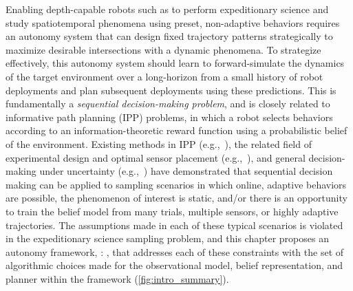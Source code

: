 Enabling depth-capable robots such as \Sentry to perform expeditionary science and study spatiotemporal phenomena using preset, non-adaptive behaviors requires an autonomy system that can design fixed trajectory patterns strategically to maximize desirable intersections with a dynamic phenomena. To strategize effectively, this autonomy system should learn to forward-simulate the dynamics of the target environment over a long-horizon from a small history of robot deployments and plan subsequent deployments using these predictions. This is fundamentally a \emph{sequential decision-making problem}, and is closely related to informative path planning (IPP) problems, in which a robot selects behaviors according to an information-theoretic reward function using a probabilistic belief of the environment. Existing methods in IPP (e.g.,~\cite{Hitz2017,hollinger2013sampling,flaspohler2019information,levine2010information,binney2012branch}), the related field of experimental design and optimal sensor placement (e.g.,~\cite{Krause2008,wang2019reinforcement}), and general decision-making under uncertainty (e.g.,~\cite{sunberg2018online, somani2013despot,kocsis2006bandit,Silver2010}) have demonstrated that sequential decision making can be applied to sampling scenarios in which online, adaptive behaviors are possible, the phenomenon of interest is static, and/or there is an opportunity to train the belief model from many trials, multiple sensors, or highly adaptive trajectories. The assumptions made in each of these typical scenarios is violated in the expeditionary science sampling problem, and this chapter proposes an autonomy framework, \PHORTEX: \phortex, that addresses each of these constraints with the set of algorithmic choices made for the observational model, belief representation, and planner within the framework (\cref{fig:intro_summary}). 


